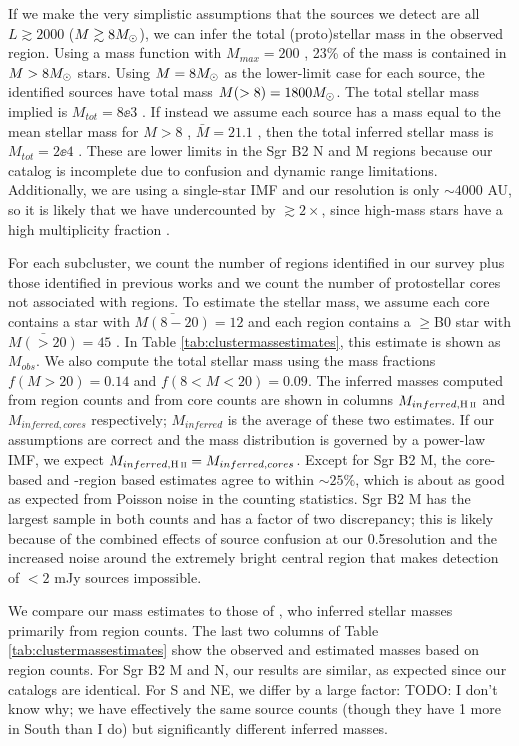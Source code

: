 \documentclass[twocolumn]{aastex61}
\begin{document}
If we make the very simplistic assumptions that the sources we detect are all
$L\gtrsim2000$ \lsun ($M\gtrsim8 M_{\odot}$), we can infer the total (proto)stellar
mass in the observed region.  Using a \citet{Kroupa2001a} mass function with
$M_{max}=200$ \msun, 23\% of the mass is contained in $M>8M_{\odot}$ stars.  Using
$M=8M_{\odot}$ as the lower-limit case for each source, the identified sources have
total mass $M(>8)=1800M_{\odot}$.  The total stellar mass implied is $M_{tot} =
8\ee{3}$ \msun.  If instead we assume each source has a mass equal to the mean
stellar mass for $M>8$ \msun, $\bar{M}=21.1$ \msun, then the total inferred
stellar mass is $M_{tot}=2\ee{4}$ \msun.  These are lower limits in the Sgr B2
N and M regions because our catalog is incomplete due to confusion and dynamic
range limitations.  Additionally, we are using a single-star IMF and our
resolution is only $\sim4000$ AU, so it is likely that we have undercounted by
$\gtrsim2\times$, since high-mass stars have a high multiplicity fraction
\citep{Mason2009a}.


For each subcluster, we count the number of \hii regions identified in our
survey plus those identified in previous works \citep{de-Pree1996a} and
we count the number of protostellar cores not associated with \hii regions.
To estimate the stellar mass, we assume each core contains a star
with $\bar{M(8-20)} = 12$ \msun and each \hii region contains a $\geq$B0 star
with $\bar{M(>20)} = 45$ \msun.  In Table \ref{tab:clustermassestimates},
this estimate is shown as $M_{obs}$.  We also compute the total stellar
mass using the mass fractions $f(M>20) = 0.14$ and $f(8<M<20)=0.09$.
The inferred masses computed from \hii region counts and from core
counts are shown in columns $M_{inferred,\hii}$ and $M_{inferred,cores}$
respectively; $M_{inferred}$ is the average of these two estimates.
If our assumptions are correct and the mass distribution is governed
by a power-law IMF, we expect $M_{inferred,\hii} = M_{inferred,cores}$.
Except for Sgr B2 M, the core-based and \hii-region based estimates agree
to within $\sim25\%$, which is about as good as expected from Poisson
noise in the counting statistics.  Sgr B2 M has the largest sample in both
counts and has a factor of two discrepancy; this is likely because of the
combined effects of source confusion at our 0.5\arcsec resolution and the
increased noise around the extremely bright central region that makes detection
of $<2$ mJy sources impossible.

We compare our mass estimates to those of \citet{Schmiedeke2016a}, who inferred
stellar masses primarily from \hii region counts.  The last two columns of Table
\ref{tab:clustermassestimates} show the observed and estimated masses based on
\hii region counts.  For Sgr B2 M and N, our results are similar, as expected
since our catalogs are identical.  For S and NE, we differ by a large factor:
TODO: I don't know why; we have effectively the same source counts (though they
have 1 more in South than I do) but significantly different inferred masses.
\end{document}
